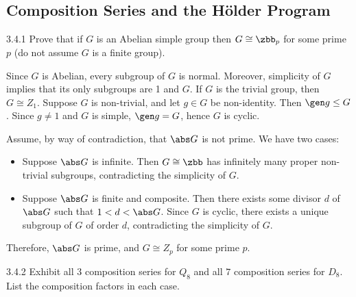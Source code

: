 \subsection{Composition Series and the H\"older Program}

\begin{exercise}{3.4.1}
    Prove that if $G$ is an Abelian simple group then $G \cong \zbb_p$ for some prime $p$ (do not assume $G$ is a finite group).
\end{exercise}

\begin{sol}
    Since $G$ is Abelian, every subgroup of $G$ is normal.
	Moreover, simplicity of $G$ implies that its only subgroups are 1 and $G$.
	If $G$ is the trivial group, then $G \cong Z_1$.
	Suppose $G$ is non-trivial, and let $g \in G$ be non-identity.
	Then $\gen g \leq G$.
	Since $g \neq 1$ and $G$ is simple, $\gen g = G$, hence $G$ is cyclic.

    Assume, by way of contradiction, that $\abs G$ is not prime.
	We have two cases:
    \begin{itemize}
        \item Suppose $\abs G$ is infinite.
	Then $G \cong \zbb$ has infinitely many proper non-trivial subgroups, contradicting the simplicity of $G$.
        \item Suppose $\abs G$ is finite and composite.
	Then there exists some divisor $d$ of $\abs G$ such that $1 < d < \abs G$.
	Since $G$ is cyclic, there exists a unique subgroup of $G$ of order $d$, contradicting the simplicity of $G$.
    \end{itemize}
    Therefore, $\abs G$ is prime, and $G \cong Z_p$ for some prime $p$.
\end{sol}

\begin{exercise}{3.4.2}
    Exhibit all $3$ composition series for $Q_8$ and all $7$ composition series for $D_8$.
	List the composition factors in each case.
\end{exercise}

